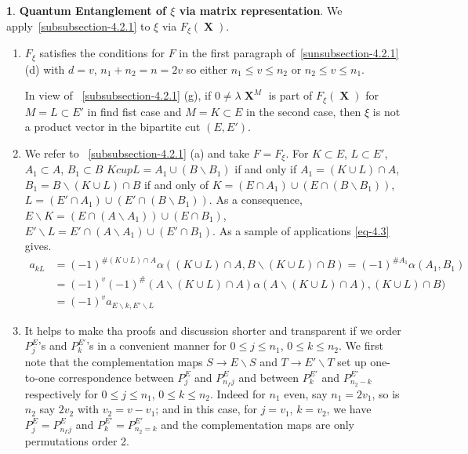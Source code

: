 \documentclass[a4paper,12pt]{article}
\DeclareMathOperator{\x}{\mathrm{X}}
\theoremstyle{definition}
\theoremstyle{underlinethm}
\theoremstyle{definition}
\newtheorem{subsubsec}{}[subsection]
\begin{document}
\begin{subsubsec}\label{subsubsection-4.2.2}
\textbf{Quantum Entanglement of $\xi$ via matrix representation}. We apply~\eqref{subsubsection-4.2.1} to $\xi$ via $F_{\xi}(\boldsymbol{\x})$.
\begin{enumerate}[label=(\alph*)]
\item $F_{\xi}$ satisfies the conditions for $F$ in the first paragraph of~\eqref{sunsubsection-4.2.1} (d) with $d=v$, $n_{1} + n_{2} =n = 2v$ so either $n_{1}\leq v \leq n_{2}$ or $n_{2} \leq v \leq n_{1}$.

In view of ~\eqref{subsubsection-4.2.1} (g), if $0 \neq \lambda \boldsymbol{\x}^{M}$ is part of $F_{\xi}(\boldsymbol{\x})$ for $M=L \subset E'$ in find fist case and $M = K \subset E$ in the second case, then $\xi$ is not a product vector in the bipartite cut $(E, E')$.

\item We refer to ~\eqref{subsubsection-4.2.1} (a) and take $F= F_{\xi}$. For $K\subset E$, $L \subset E'$, $A_{1} \subset A$, $B_{1} \subset B$ $K cup L = A_{1} \cup (B \smallsetminus B_{1})$ if and only if $A_{1} = (K \cup L) \cap A$, $B_{1}= B \smallsetminus (K \cup L)\cap B$ if and only of $K =(E \cap A_{1}) \cup (E \cap (B\smallsetminus B_{1}))$, $L=(E' \cap A_{1})\cup (E' \cap (B \smallsetminus B_{1}))$. As a consequence, $E \smallsetminus K = (E \cap (A \smallsetminus A_{1})) \cup (E \cap B_{1})$, $E' \smallsetminus L = E' \cap (A \smallsetminus A_{1}) \cup (E' \cap B_{1})$. As a sample of applications \eqref{eq-4.3} gives.
\begin{align*}
a_{k L} &= (-1)^{\#(K \cup L)\cap A} \alpha \left((K \cup L) \cap A, B \smallsetminus (K \cup L) \cap B \right) = (-1)^{\# A_{1}} \alpha(A _{1}, B_{1})\\
 & = (-1)^{v} (-1)^{\#} (A \smallsetminus (K \cup L) \cap A) \alpha (A \smallsetminus (K \cup L) \cap A), (K \cup L )\cap B)\\
 & = (-1)^{v} a_{E \smallsetminus k, E' \smallsetminus L} \tag{4.21}\label{eq-4.21}
\end{align*}

\item It helps to make tha proofs and discussion shorter and transparent if we order $P_{j}^{E}$'s and $P_{k}^{E'}$'s in a convenient manner for $0 \leq j \leq n_{1}$, $0 \leq k \leq n_{2}$. We first note that the complementation maps $S \rightarrow E \smallsetminus S$ and $T \rightarrow E' \smallsetminus T$ set up one-to-one correspondence between $P_{j}^{E}$ and $P_{n_{\Gamma}j}^{E}$ and between $P_{k}^{E'}$ and $P_{n_{2}-k}^{E'}$ respectively for $0 \leq j \leq n_{1}$, $0 \leq k \leq n_{2}$. Indeed for $n_{1}$ even, say $n_{1}= 2v_{1}$, so is $n_{2}$ say $2v_{2}$ with $v_{2}= v-v_{1}$; and in this case, for $j=v_{1}$, $k=v_{2}$, we have $P_{j}^{E}= P_{n_{\Gamma}j}^{E}$ and $P_{k}^{E'} = P_{n_{2}=k}^{E'}$ and the complementation maps are only permutations order 2.


\end{enumerate}
\end{subsubsec}
\end{document}
